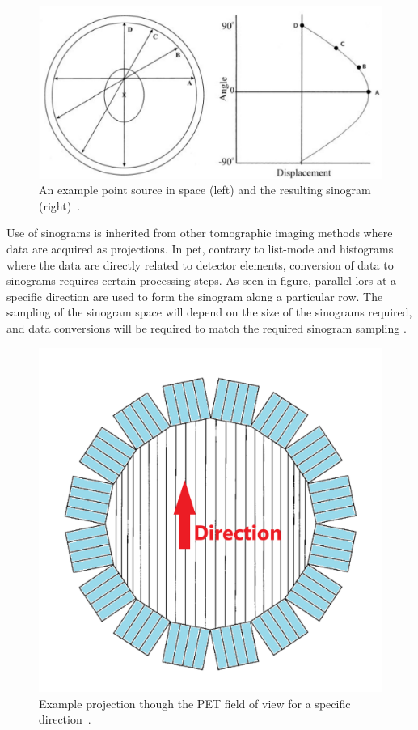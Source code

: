 \begin{itemize}
\begin{figure} [h!]
\centering
\includegraphics[scale=0.30,angle=0]{2_Theory_Methods/figures/Sinogram.png}
\caption{An example point source in space (left) and the resulting sinogram (right)~\cite{Fahey2002}.} 
\label{fig_2:Sinogram}
\end{figure} 

Use of sinograms is inherited from other tomographic imaging methods where data are acquired as projections. In \gls{pet}, contrary to list-mode and histograms where the data are directly related to detector elements, conversion of data to sinograms requires certain processing steps. As seen in figure, parallel \glspl{lor} at a specific direction are used to form the sinogram along a particular row. The sampling of the sinogram space will depend on the size of the sinograms required, and data conversions will be required  to match the required sinogram sampling \cite{Fahey2002}. 

\begin{figure} [h!]
\centering
\includegraphics[scale=0.30,angle=0]{2_Theory_Methods/figures/Sinogram_detector_to_Sino.png}
\caption{Example projection though the PET field of view for a specific direction~\cite{Fahey2002}.} 
\label{fig_2:Sinogram_detector_to_Sino}
\end{figure} 


\end{itemize}
